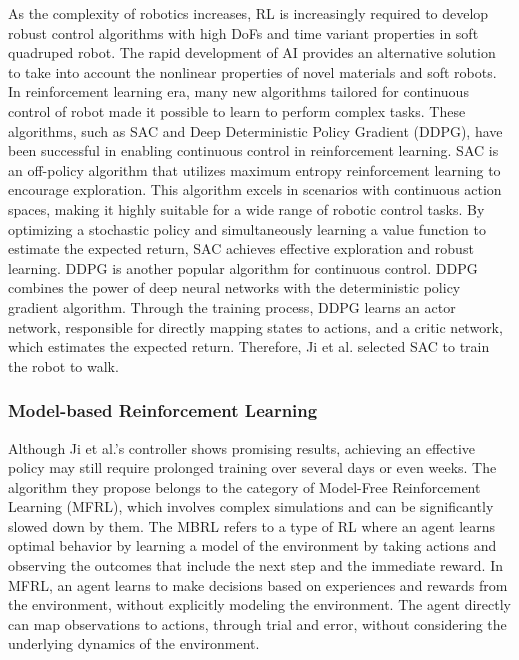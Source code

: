 As the complexity of robotics increases, \ac{RL} is increasingly required to develop robust control algorithms with high \ac{DoF}s and time variant properties\cite{zhangEffectiveSoftRobot2017} in soft quadruped robot. The rapid development of AI provides an alternative solution to take into account the nonlinear properties of novel materials and soft robots\cite{tangModelbasedOnlineLearning2021}. In reinforcement learning era, many new algorithms tailored for continuous control of robot made it possible to learn to perform complex tasks. These algorithms, such as \ac{SAC}\cite{haarnojaSoftActorCriticOffPolicy2018} and Deep Deterministic Policy Gradient (DDPG)\cite{silverDeterministicPolicyGradient2014}, have been successful in enabling continuous control in reinforcement learning\cite{haarnojaLearningWalkDeep2019, pengSimtoRealTransferRobotic2018}. SAC is an off-policy algorithm that utilizes maximum entropy reinforcement learning to encourage exploration. This algorithm excels in scenarios with continuous action spaces, making it highly suitable for a wide range of robotic control tasks. By optimizing a stochastic policy and simultaneously learning a value function to estimate the expected return, SAC achieves effective exploration and robust learning. DDPG is another popular algorithm for continuous control. DDPG combines the power of deep neural networks with the deterministic policy gradient algorithm. Through the training process, DDPG learns an actor network, responsible for directly mapping states to actions, and a critic network, which estimates the expected return. Therefore, Ji et al. \cite{jiSynthesizingOptimalGait2022} selected \ac{SAC} to train the robot to walk.

\subsubsection{Model-based Reinforcement Learning}
Although Ji et al.'s controller shows promising results, achieving an effective policy may still require prolonged training over several days or even weeks. The algorithm they propose belongs to the category of Model-Free Reinforcement Learning (MFRL), which involves complex simulations and can be significantly slowed down by them. The \ac{MBRL} refers to a type of \ac{RL} where an agent learns optimal behavior by learning a model of the environment by taking actions and observing the outcomes that include the next step and the immediate reward. In \ac{MFRL}, an agent learns to make decisions based on experiences and rewards from the environment, without explicitly modeling the environment. The agent directly can map observations to actions, through trial and error, without considering the underlying dynamics of the environment.


